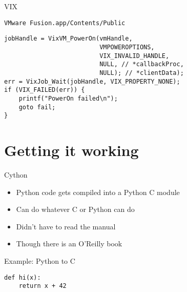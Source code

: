\documentclass[xcolor=svgnames,17pt]{beamer}
\newcommand*{\sizefont}[1]{%
    \ifcase#1\relax
    \or \tiny
    \or \scriptsize
    \or \footnotesize
    \or \small
    \or \normalsize
    \or \large
    \or \Large
    \or \LARGE
    \or \huge
    \or \Huge
    \fi}
\begin{document}
\begin{frame}[fragile]{VIX}

\texttt{VMware Fusion.app/Contents/Public} \\

\small
{}

\sizefont 2
\begin{verbatim}
jobHandle = VixVM_PowerOn(vmHandle,
                          VMPOWEROPTIONS,
                          VIX_INVALID_HANDLE,
                          NULL, // *callbackProc,
                          NULL); // *clientData);
err = VixJob_Wait(jobHandle, VIX_PROPERTY_NONE);
if (VIX_FAILED(err)) {
    printf("PowerOn failed\n");
    goto fail;
}
\end{verbatim}

\end{frame}

\section{Getting it working}

\begin{frame}{}
\tableofcontents[currentsection]
\end{frame}

\begin{frame}{Cython}

\begin{itemize}
\item Python code gets compiled into a Python C module
\item Can do whatever C or Python can do
\item Didn’t have to read the manual
\item Though there is an O’Reilly book
\end{itemize}

\end{frame}

\begin{frame}[fragile]{Example: Python to C}

\begin{verbatim}
def hi(x):
    return x + 42
\end{verbatim}

\end{frame}
\end{document}
